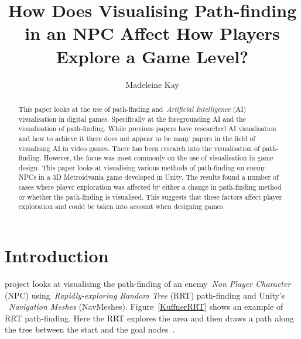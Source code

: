 \documentclass[journal]{IEEEtran}
\begin{document}
	\title{ How Does Visualising Path-finding in an NPC Affect How Players Explore a Game Level?}
	\author{Madeleine Kay}
	
	
	\maketitle
	
	\begin{abstract}
		This paper looks at the use of path-finding and~\textit{Artificial Intelligence} (AI) visualisation in digital games.   Specifically at the foregrounding AI and the visualisation of path-finding. 
		While previous papers have researched AI visualisation and how to achieve it there does not appear to be many papers in the field of visualising AI in video games. There has been research into the visualisation of path-finding. However, the focus was most commonly on the use of visualisation in game design. 
		This paper looks at visualising various methods of path-finding on enemy NPCs in a 3D Metroidvania game developed in Unity.
		The results found a number of cases where player exploration was affected by either a change in path-finding method or whether the path-finding is visualised. This suggests that these factors affect player exploration and could be taken into account when designing games.
	\end{abstract}
	
	\section{Introduction} \label{introduction}
	 project looks at visualising the path-finding of an enemy~\textit{Non Player Character} (NPC) using~\textit{Rapidly-exploring Random Tree} (RRT) path-finding and Unity's ~\textit{Navigation Meshes} (NavMeshes).  Figure~\ref{KuffnerRRT} shows an example of RRT path-finding. Here the RRT explores the area and then draws a path along the tree between the start and the goal nodes~\cite{Kuffner2000}. 
	
\end{document}
